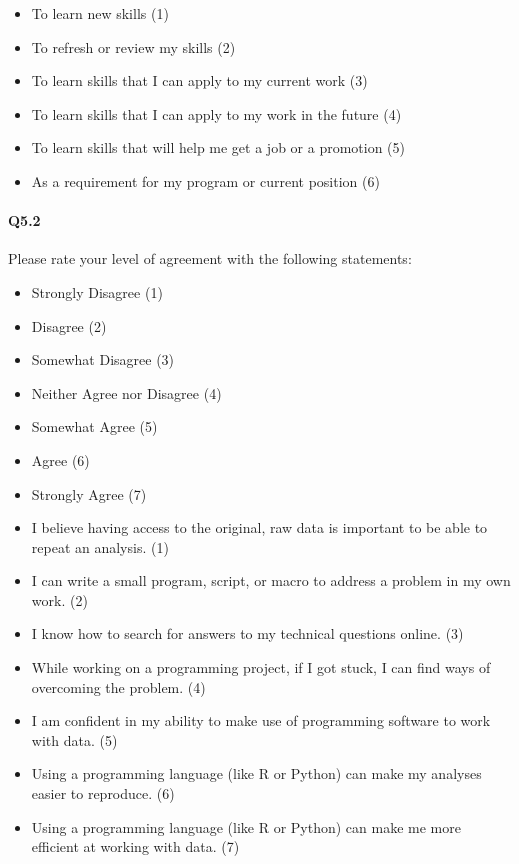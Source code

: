 \documentclass[030-workshop.tex]{subfiles}
\begin{document}
        \begin{itemize}
            \item To learn new skills  (1)
            \item To refresh or review my skills  (2)
            \item To learn skills that I can apply to my current work  (3)
            \item To learn skills that I can apply to my work in the future  (4)
            \item To learn skills that will help me get a job or a promotion  (5)
            \item As a requirement for my program or current position  (6)
        \end{itemize}

    \paragraph{Q5.2}

        Please rate your level of agreement with the following statements:

        \begin{itemize}
            \item Strongly Disagree (1)
            \item Disagree (2)
            \item Somewhat Disagree (3)
            \item Neither Agree nor Disagree (4)
            \item Somewhat Agree (5)
            \item Agree (6)
            \item Strongly Agree (7)
        \end{itemize}

        \begin{itemize}
            \item I believe having access to the original, raw data is important to be able to repeat an analysis. (1)
            \item I can write a small program, script, or macro to address a problem in my own work. (2)
            \item I know how to search for answers to my technical questions online. (3)
            \item While working on a programming project, if I got stuck, I can find ways of overcoming the problem. (4)
            \item I am confident in my ability to make use of programming software to work with data. (5)
            \item Using a programming language (like R or Python) can make my analyses easier to reproduce. (6)
            \item Using a programming language (like R or Python) can make me more efficient at working with data. (7)
        \end{itemize}
\end{document}
